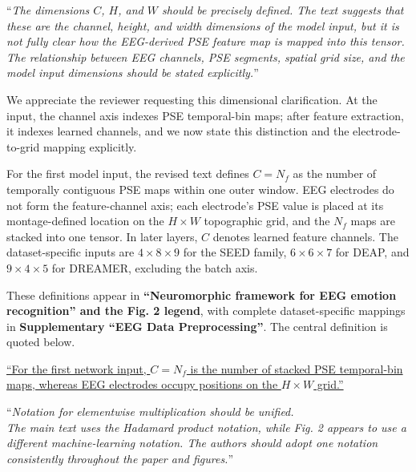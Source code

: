 \documentclass[12pt,technote,onecolumn]{IEEEtran}
\begin{document}
``{\it The dimensions \(C\), \(H\), and \(W\) should be precisely defined. The
text suggests that these are the channel, height, and width
dimensions of the model input, but it is not fully clear how the
EEG-derived PSE feature map is mapped into this tensor. The relationship
between EEG channels, PSE segments, spatial grid size, and the model
input dimensions should be stated explicitly.}''
\vspace{1mm}


We appreciate the reviewer requesting this dimensional clarification. At the input, the channel axis indexes PSE temporal-bin maps; after feature extraction, it indexes learned channels, and we now state this distinction and the electrode-to-grid mapping explicitly.

For the first model input, the revised text defines \(C=N_f\) as the
number of temporally contiguous PSE maps within one outer window. EEG
electrodes do not form the feature-channel axis; each electrode's PSE
value is placed at its montage-defined location on the \(H\times W\)
topographic grid, and the \(N_f\) maps are stacked into one tensor. In
later layers, \(C\) denotes learned feature channels. The
dataset-specific inputs are \(4\times8\times9\) for the SEED family,
\(6\times6\times7\) for DEAP, and \(9\times4\times5\) for DREAMER,
excluding the batch axis.



These definitions appear in \textbf{``Neuromorphic framework for EEG emotion recognition'' and the Fig. 2 legend}, with complete dataset-specific mappings in \textbf{Supplementary ``EEG Data Preprocessing''}. The central definition is quoted below.

\uline{``For the first network input, $C=N_f$ is the number of stacked PSE temporal-bin maps, whereas EEG electrodes occupy positions on the $H\times W$ grid.''}

\vspace{4mm}

``{\it Notation for elementwise multiplication should be unified.\\
The main text uses the Hadamard product notation, while Fig. 2 appears
to use a different machine-learning notation. The authors should adopt
one notation consistently throughout the paper and figures.}''
\vspace{1mm}

\end{document}
